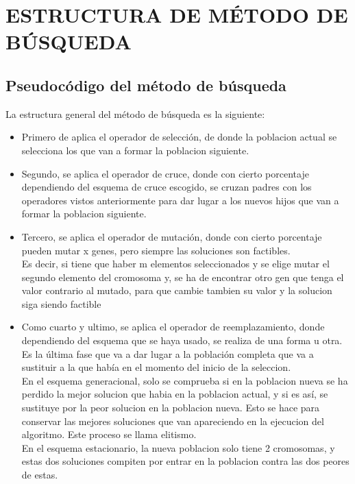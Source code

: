 \documentclass{article}
\begin{document}
\newpage
\section{\large ESTRUCTURA DE MÉTODO DE BÚSQUEDA}

\subsection{\normalsize Pseudocódigo del método de búsqueda}
La estructura general del método de búsqueda es la siguiente:
\begin{itemize}
\item Primero de aplica el operador de selección, de donde la poblacion actual se 
selecciona los que van a formar la poblacion siguiente.
\item Segundo, se aplica el operador de cruce, donde con cierto porcentaje dependiendo
del esquema de cruce escogido, se cruzan padres con los operadores vistos anteriormente 
para dar lugar a los nuevos hijos que van a formar la poblacion siguiente.
\item Tercero, se aplica el operador de mutación, donde con cierto porcentaje 
pueden mutar x genes, pero siempre las soluciones son factibles.\\
Es decir, si tiene que haber m elementos seleccionados y se elige mutar el segundo elemento del 
cromosoma y, se ha de encontrar otro gen que tenga el valor contrario al mutado, para que cambie tambien
su valor y la solucion siga siendo factible
\item Como cuarto y ultimo, se aplica el operador de reemplazamiento, donde dependiendo del
esquema que se haya usado, se realiza de una forma u otra. Es la última fase que va a dar
lugar a la población completa que va a sustituir a la que había en el momento del 
inicio de la seleccion.\\
En el esquema generacional, solo se comprueba si en la poblacion 
nueva se ha perdido la mejor solucion que habia en la poblacion actual, y si es así, se
sustituye por la peor solucion en la poblacion nueva. Esto se hace para conservar las 
mejores soluciones que van apareciendo en la ejecucion del algoritmo. Este proceso se llama elitismo.\\
En el esquema estacionario, la nueva poblacion solo tiene 2 cromosomas, y estas dos soluciones 
compiten por entrar en la poblacion contra las dos peores de estas. 

\end{itemize}
\end{document}
